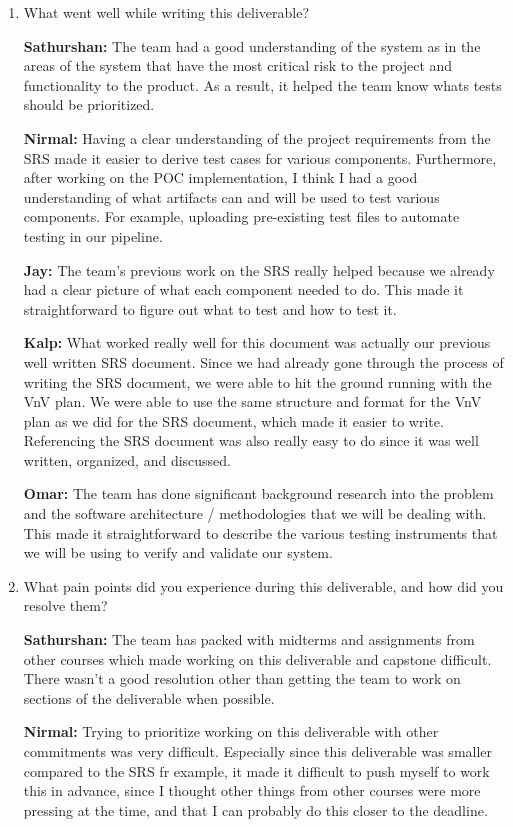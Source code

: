\documentclass[12pt, titlepage]{article}
\begin{document}
\begin{enumerate}
  \item What went well while writing this deliverable?

  \textbf{Sathurshan:} The team had a good understanding of the system as in the
  areas of the system that have the most critical risk to the project and
  functionality to the product. As a result, it helped the team know whats tests
  should be prioritized.

  \textbf{Nirmal:} Having a clear understanding of the project requirements from
  the SRS made it easier to derive test cases for various components.
  Furthermore, after working on the POC implementation, I think I had a good
  understanding of what artifacts can and will be used to test various
  components. For example, uploading pre-existing test files to automate testing
  in our pipeline.

  \textbf{Jay:} The team's previous work on the SRS really helped because we
  already had a clear picture of what each component needed to do. This made it
  straightforward to figure out what to test and how to test it.

  \textbf{Kalp:} What worked really well for this document was actually our
  previous well written SRS document. Since we had already gone through the
  process of writing the SRS document, we were able to hit the ground running
  with the VnV plan. We were able to use the same structure and format for the
  VnV plan as we did for the SRS document, which made it easier to write.
  Referencing the SRS document was also really easy to do since it was well
  written, organized, and discussed. 

  \textbf{Omar:} The team has done significant background research into the
  problem and the software architecture / methodologies that we will be dealing
  with. This made it straightforward to describe the various testing instruments
  that we will be using to verify and validate our system.

  \item What pain points did you experience during this deliverable, and how did
    you resolve them?

  \textbf{Sathurshan:} The team has packed with midterms and assignments from
  other courses which made working on this deliverable and capstone difficult.
  There wasn't a good resolution other than getting the team to work on sections
  of the deliverable when possible.

  \textbf{Nirmal:} Trying to prioritize working on this deliverable with other
  commitments was very difficult. Especially since this deliverable was smaller
  compared to the SRS fr example, it made it difficult to push myself to work
  this in advance, since I thought other things from other courses were more
  pressing at the time, and that I can probably do this closer to the deadline.


\end{enumerate}
\end{document}
